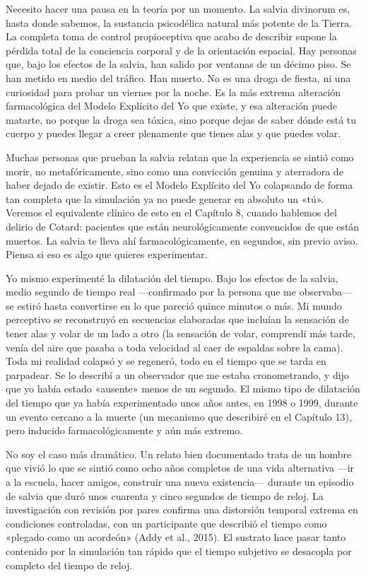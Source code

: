 \documentclass[11pt, twoside, openright]{book}
\begin{document}
Necesito hacer una pausa en la teoría por un momento. La salvia divinorum es, hasta donde sabemos, la sustancia psicodélica natural más potente de la Tierra. La completa toma de control propioceptiva que acabo de describir supone la pérdida total de la conciencia corporal y de la orientación espacial. Hay personas que, bajo los efectos de la salvia, han salido por ventanas de un décimo piso. Se han metido en medio del tráfico. Han muerto. No es una droga de fiesta, ni una curiosidad para probar un viernes por la noche. Es la más extrema alteración farmacológica del Modelo Explícito del Yo que existe, y esa alteración puede matarte, no porque la droga sea tóxica, sino porque dejas de saber dónde está tu cuerpo y puedes llegar a creer plenamente que tienes alas y que puedes volar.

Muchas personas que prueban la salvia relatan que la experiencia se sintió como morir, no metafóricamente, sino como una convicción genuina y aterradora de haber dejado de existir. Esto es el Modelo Explícito del Yo colapsando de forma tan completa que la simulación ya no puede generar en absoluto un «tú». Veremos el equivalente clínico de esto en el Capítulo 8, cuando hablemos del delirio de Cotard: pacientes que están neurológicamente convencidos de que están muertos. La salvia te lleva ahí farmacológicamente, en segundos, sin previo aviso. Piensa si eso es algo que quieres experimentar.

Yo mismo experimenté la dilatación del tiempo. Bajo los efectos de la salvia, medio segundo de tiempo real ---confirmado por la persona que me observaba--- se estiró hasta convertirse en lo que pareció quince minutos o más. Mi mundo perceptivo se reconstruyó en secuencias elaboradas que incluían la sensación de tener alas y volar de un lado a otro (la sensación de volar, comprendí más tarde, venía del aire que pasaba a toda velocidad al caer de espaldas sobre la cama). Toda mi realidad colapsó y se regeneró, todo en el tiempo que se tarda en parpadear. Se lo describí a un observador que me estaba cronometrando, y dijo que yo había estado «ausente» menos de un segundo. El mismo tipo de dilatación del tiempo que ya había experimentado unos años antes, en 1998 o 1999, durante un evento cercano a la muerte (un mecanismo que describiré en el Capítulo 13), pero inducido farmacológicamente y aún más extremo.

No soy el caso más dramático. Un relato bien documentado trata de un hombre que vivió lo que se sintió como ocho años completos de una vida alternativa ---ir a la escuela, hacer amigos, construir una nueva existencia--- durante un episodio de salvia que duró unos cuarenta y cinco segundos de tiempo de reloj. La investigación con revisión por pares confirma una distorsión temporal extrema en condiciones controladas, con un participante que describió el tiempo como «plegado como un acordeón» (Addy et al., 2015). El sustrato hace pasar tanto contenido por la simulación tan rápido que el tiempo subjetivo se desacopla por completo del tiempo de reloj.
\end{document}
